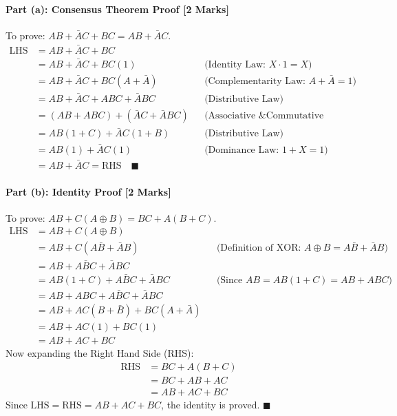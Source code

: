 \documentclass[11pt,a4paper,oneside]{book}
\begin{document}
\paragraph{Part (a): Consensus Theorem Proof [2 Marks]}
To prove: $AB + \bar{A}C + BC = AB + \bar{A}C$.
\begin{align*}
\text{LHS} &= AB + \bar{A}C + BC \\
&= AB + \bar{A}C + BC(1) && \text{(Identity Law: } X \cdot 1 = X\text{)} \\
&= AB + \bar{A}C + BC(A + \bar{A}) && \text{(Complementarity Law: } A + \bar{A} = 1\text{)} \\
&= AB + \bar{A}C + ABC + \bar{A}BC && \text{(Distributive Law)} \\
&= (AB + ABC) + (\bar{A}C + \bar{A}BC) && \text{(Associative \& Commutative Laws)} \\
&= AB(1 + C) + \bar{A}C(1 + B) && \text{(Distributive Law)} \\
&= AB(1) + \bar{A}C(1) && \text{(Dominance Law: } 1 + X = 1\text{)} \\
&= AB + \bar{A}C = \text{RHS} \quad \blacksquare
\end{align*}

\paragraph{Part (b): Identity Proof [2 Marks]}
To prove: $AB + C(A \oplus B) = BC + A(B+C)$.
\begin{align*}
\text{LHS} &= AB + C(A \oplus B) \\
&= AB + C(A\bar{B} + \bar{A}B) && \text{(Definition of XOR: } A \oplus B = A\bar{B} + \bar{A}B\text{)} \\
&= AB + A\bar{B}C + \bar{A}BC \\
&= AB(1 + C) + A\bar{B}C + \bar{A}BC && \text{(Since } AB = AB(1+C) = AB + ABC\text{)} \\
&= AB + ABC + A\bar{B}C + \bar{A}BC \\
&= AB + AC(B + \bar{B}) + BC(A + \bar{A}) \\
&= AB + AC(1) + BC(1) \\
&= AB + AC + BC
\end{align*}
Now expanding the Right Hand Side (RHS):
\begin{align*}
\text{RHS} &= BC + A(B + C) \\
&= BC + AB + AC \\
&= AB + AC + BC
\end{align*}
Since $\text{LHS} = \text{RHS} = AB + AC + BC$, the identity is proved. $\blacksquare$
\end{document}
